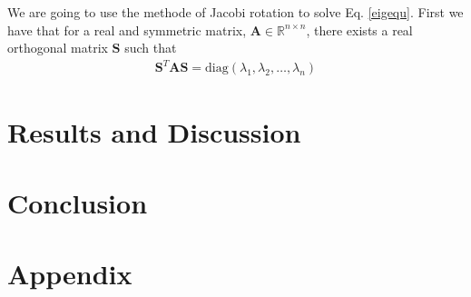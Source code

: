 \documentclass[11pt, a4paper]{article}
\begin{document}
We are going to use the methode of Jacobi rotation to solve Eq. \eqref{eigequ}. First we have that for a real and symmetric matrix, $\mathbf{A} \in \mathbb{R}^{n\times n}$, there exists a real orthogonal matrix $\mathbf{S}$ such that
\begin{gather}
\mathbf{S}^T\mathbf{AS} = \text{diag}(\lambda_1, \lambda_2, \dots, \lambda_n)
\end{gather}
\clearpage
\section{Results and Discussion}
\clearpage

\section{Conclusion}


\clearpage
\appendix
\section{Appendix}
\end{document}
